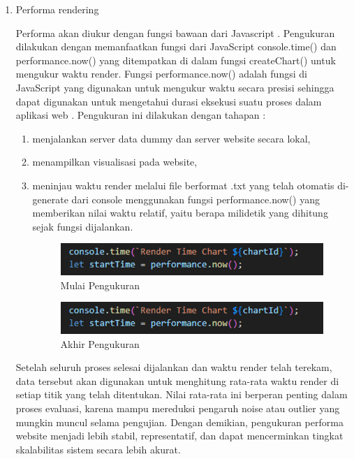 \begin{enumerate}
	\item Performa rendering

	Performa akan diukur dengan fungsi bawaan dari Javascript \cite{Persson2021} \cite{Bostrm2022}. Pengukuran dilakukan dengan memanfaatkan fungsi dari JavaScript console.time() dan performance.now() yang ditempatkan di dalam fungsi createChart() untuk mengukur waktu render. Fungsi performance.now() adalah fungsi di JavaScript yang digunakan untuk mengukur waktu secara presisi sehingga dapat digunakan untuk mengetahui durasi eksekusi suatu proses dalam aplikasi web \cite{Mozilla}. Pengukuran ini dilakukan dengan tahapan : 
	\begin{enumerate}[label={\arabic*.}]
		\item menjalankan server data dummy dan server website secara lokal,
		\item menampilkan visualisasi pada website, 
		\item meninjau waktu render melalui file berformat .txt yang telah otomatis di-generate dari console menggunakan fungsi performance.now() yang memberikan nilai waktu relatif, yaitu berapa milidetik yang dihitung sejak fungsi dijalankan. 
			\begin{figure}[H]
			\centering
			\includegraphics[width=0.8\linewidth]{gambar/Metodologi/Start Performance Now.png}
			\caption{Mulai Pengukuran}
			\label{Mulai Pengukuran Render}
		\end{figure}
			\begin{figure}[H]
			\centering
			\includegraphics[width=0.8\linewidth]{gambar/Metodologi/Start Performance Now.png}
			\caption{Akhir Pengukuran}
			\label{Akhir Pengukuran Render}
		\end{figure}
	\end{enumerate}
			Setelah seluruh proses selesai dijalankan dan waktu render telah terekam, data tersebut akan digunakan untuk menghitung rata-rata waktu render di setiap titik yang telah ditentukan. Nilai rata-rata ini berperan penting dalam proses evaluasi, karena mampu mereduksi pengaruh noise atau outlier yang mungkin muncul selama pengujian. Dengan demikian, pengukuran performa website menjadi lebih stabil, representatif, dan dapat mencerminkan tingkat skalabilitas sistem secara lebih akurat.
	

\end{enumerate}
